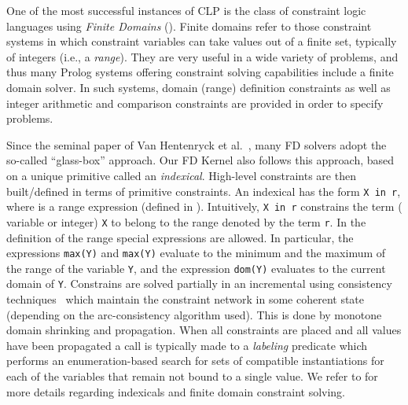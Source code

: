 \documentclass{llncs}
\renewcommand\cref[1]{\Cref{#1}}
\newcommand{\fd}{\xspace}
\begin{document}
One of the most successful instances of CLP is the class of constraint
logic languages using \emph{Finite Domains} (\fd).
Finite domains refer to those constraint systems in which constraint
variables can take values out of a finite set, typically of integers
(i.e., a {\em range}). They are very useful in a wide variety of problems, and thus many
Prolog systems offering constraint solving capabilities include a
finite domain solver.
In such systems, domain (range) definition
constraints as well as integer arithmetic and comparison constraints are
provided in order to specify problems.

Since the seminal paper of Van Hentenryck et al.~\cite{ccfd-jlp}, many
FD solvers adopt the so-called ``glass-box'' approach. Our FD Kernel also 
follows this approach, based on a unique primitive called an
\emph{indexical}. High-level constraints are then built/defined in terms of
primitive constraints.
An indexical has the form
\verb|X in r|, where  is a range expression (defined in
\cref{fig:range:syntax}).  Intuitively, \verb|X in r| constrains the
\fd term (\fd variable or integer) \verb|X| to belong to the range
denoted by the term \verb|r|. In the definition of the range special
expressions are allowed. In particular, the expressions \verb|max(Y)|
and \verb|max(Y)| evaluate to the minimum and the maximum of the range
of the \fd variable \verb|Y|, and the expression \verb|dom(Y)|
evaluates to the current domain of \verb|Y|.
Constrains are solved partially in an incremental using consistency
techniques~\cite{Dib10arc_consistency_survey} which maintain the constraint network in
some coherent state (depending on the arc-consistency algorithm
used). This is done by monotone domain shrinking and propagation. When
all constraints are placed and all values have been propagated a call
is typically made to a \emph{labeling} predicate which performs an
enumeration-based search for sets of compatible instantiations for
each of the variables that remain not bound to a single value. We
refer to \cite{ccfd-jlp} for more details regarding indexicals and
finite domain constraint solving.
\end{document}
